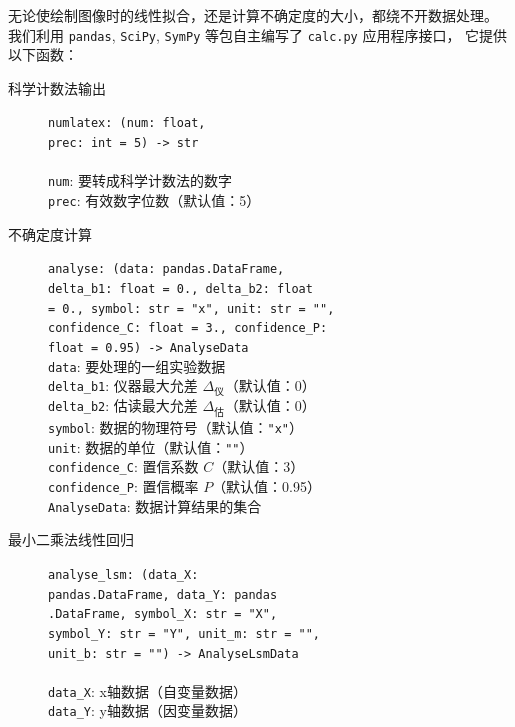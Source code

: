 无论使绘制图像时的线性拟合，还是计算不确定度的大小，都绕不开数据处理。
我们利用 \verb|pandas|, \verb|SciPy|, \verb|SymPy| 等包自主编写了 \verb|calc.py| 应用程序接口，
它提供以下函数：
\begin{description}
  \item[科学计数法输出] \verb|numlatex: (num: float,|\\\verb|prec: int = 5) -> str|\\
  \\
  \verb|num|: 要转成科学计数法的数字\\
  \verb|prec|: 有效数字位数（默认值：5）
  \item[不确定度计算] \verb|analyse: (data: pandas.DataFrame,|\\\verb|delta_b1: float = 0., delta_b2: float|\\\verb|= 0., symbol: str = "x", unit: str = "",|\\\verb|confidence_C: float = 3., confidence_P:|\\\verb|float = 0.95) -> AnalyseData|\\
  \verb|data|: 要处理的一组实验数据\\
  \verb|delta_b1|: 仪器最大允差 \(\Delta_\text{仪}\)（默认值：0）\\
  \verb|delta_b2|: 估读最大允差 \(\Delta_\text{估}\)（默认值：0）\\
  \verb|symbol|: 数据的物理符号（默认值：\verb|"x"|）\\
  \verb|unit|: 数据的单位（默认值：\verb|""|）\\
  \verb|confidence_C|: 置信系数 \(C\)（默认值：3）\\
  \verb|confidence_P|: 置信概率 \(P\)（默认值：0.95）\\
  \verb|AnalyseData|: 数据计算结果的集合
  \item[最小二乘法线性回归] \verb|analyse_lsm: (data_X:|\\\verb|pandas.DataFrame, data_Y: pandas|\\\verb|.DataFrame, symbol_X: str = "X",|\\\verb|symbol_Y: str = "Y", unit_m: str = "",|\\\verb|unit_b: str = "") -> AnalyseLsmData|\\
  \\
  \verb|data_X|: x轴数据（自变量数据）\\
  \verb|data_Y|: y轴数据（因变量数据）\\

\end{description}
